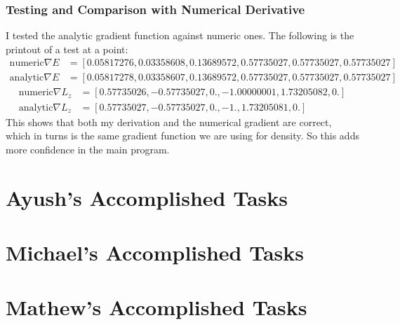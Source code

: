 \documentclass[12pt]{article}
\begin{document}
\subsubsection{Testing and Comparison with Numerical Derivative}
I tested the analytic gradient function against numeric ones. The following is the printout of a test at a point:
\begin{align*}
\text{numeric} \nabla E &=  [0.05817276, 0.03358608, 0.13689572, 0.57735027, 0.57735027, 0.57735027]\\
\text{analytic} \nabla E &= [0.05817278, 0.03358607, 0.13689572, 0.57735027, 0.57735027, 0.57735027]
\end{align*}
\begin{align*}
 \text{numeric} \nabla L_z &=  [ 0.57735026, -0.57735027,  0.,         -1.00000001,  1.73205082,  0.        ] \\
 \text{analytic} \nabla L_z &= [ 0.57735027, -0.57735027,  0.,         -1.,          1.73205081,  0.        ] 
\end{align*}
This shows that both my derivation and the numerical gradient are correct, which in turns is the same gradient function we are using for density. So this adds more confidence in the main program.


\section{Ayush’s Accomplished Tasks}


\section{Michael's Accomplished Tasks}


\section{Mathew's Accomplished Tasks}
\end{document}
